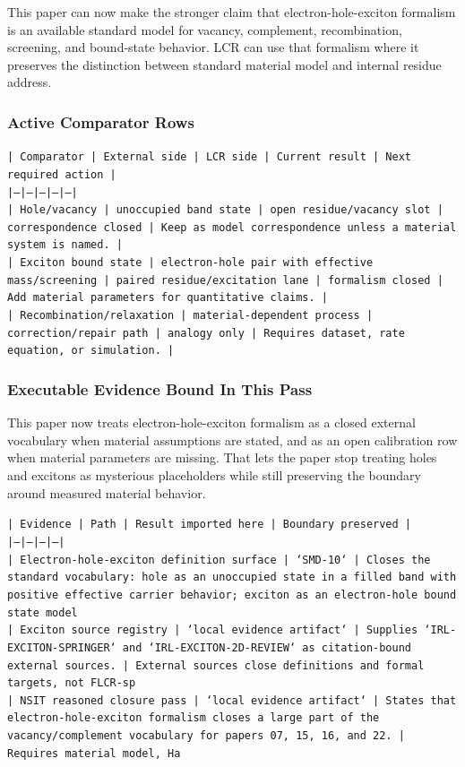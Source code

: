 \documentclass[11pt]{article}
\begin{document}
This paper can now make the stronger claim that electron-hole-exciton formalism is an available standard model for vacancy, complement, recombination, screening, and bound-state behavior. LCR can use that formalism where it preserves the distinction between standard material model and internal residue address.

\subsubsection*{Active Comparator Rows}

\noindent\texttt{| Comparator | External side | LCR side | Current result | Next required action |}\\
\noindent\texttt{|---|---|---|---|---|}\\
\noindent\texttt{| Hole/vacancy | unoccupied band state | open residue/vacancy slot | correspondence closed | Keep as model correspondence unless a material system is named. |}\\
\noindent\texttt{| Exciton bound state | electron-hole pair with effective mass/screening | paired residue/excitation lane | formalism closed | Add material parameters for quantitative claims. |}\\
\noindent\texttt{| Recombination/relaxation | material-dependent process | correction/repair path | analogy only | Requires dataset, rate equation, or simulation. |}\\

\subsubsection*{Executable Evidence Bound In This Pass}

This paper now treats electron-hole-exciton formalism as a closed external vocabulary when material assumptions are stated, and as an open calibration row when material parameters are missing. That lets the paper stop treating holes and excitons as mysterious placeholders while still preserving the boundary around measured material behavior.

\noindent\texttt{| Evidence | Path | Result imported here | Boundary preserved |}\\
\noindent\texttt{|---|---|---|---|}\\
\noindent\texttt{| Electron-hole-exciton definition surface | `SMD-10` | Closes the standard vocabulary: hole as an unoccupied state in a filled band with positive effective carrier behavior; exciton as an electron-hole bound state model}\\
\noindent\texttt{| Exciton source registry | `local evidence artifact` | Supplies `IRL-EXCITON-SPRINGER` and `IRL-EXCITON-2D-REVIEW` as citation-bound external sources. | External sources close definitions and formal targets, not FLCR-sp}\\
\noindent\texttt{| NSIT reasoned closure pass | `local evidence artifact` | States that electron-hole-exciton formalism closes a large part of the vacancy/complement vocabulary for papers 07, 15, 16, and 22. | Requires material model, Ha}\\
\end{document}
